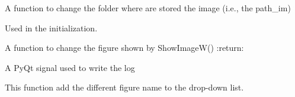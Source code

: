 \documentclass[letterpaper,10pt,english]{sphinxmanual}
\begin{document}
\begin{fulllineitems}
\begin{fulllineitems}
\label{\detokenize{index:src_GUI.Main_windows_1.ShowImageW.change_folder}}
A function to change the folder where are stored the image (i.e., the path\_im)

\end{fulllineitems}


\begin{fulllineitems}
\label{\detokenize{index:src_GUI.Main_windows_1.ShowImageW.init_iu}}
Used in the initialization.

\end{fulllineitems}


\begin{fulllineitems}
\label{\detokenize{index:src_GUI.Main_windows_1.ShowImageW.selectionchange}}
A function to change the figure shown by ShowImageW()
:return:

\end{fulllineitems}


\begin{fulllineitems}
\label{\detokenize{index:src_GUI.Main_windows_1.ShowImageW.send_log}}
A PyQt signal used to write the log

\end{fulllineitems}


\begin{fulllineitems}
\label{\detokenize{index:src_GUI.Main_windows_1.ShowImageW.update_namefig}}
This function add the different figure name to the drop-down list.

\end{fulllineitems}


\end{fulllineitems}

\end{document}
